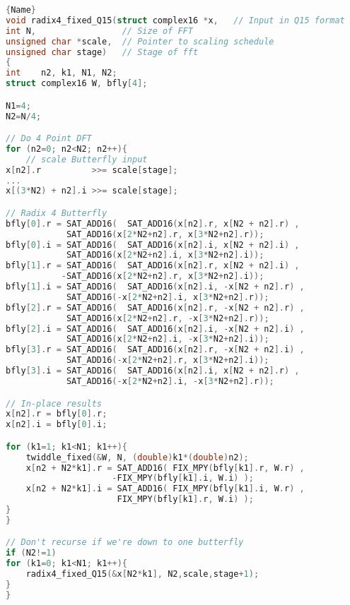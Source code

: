 \documentclass[a4paper]{article}
\begin{document}
\begin{lstlisting}[caption=fft.c - radix4 Q15,label={CODE:RADIX4},frame=tlrb, language=C]{Name}
void radix4_fixed_Q15(struct complex16 *x,   // Input in Q15 format
int N,                 // Size of FFT
unsigned char *scale,  // Pointer to scaling schedule
unsigned char stage)   // Stage of fft
{
int    n2, k1, N1, N2;
struct complex16 W, bfly[4];

N1=4;
N2=N/4;

// Do 4 Point DFT
for (n2=0; n2<N2; n2++){
    // scale Butterfly input
x[n2].r          >>= scale[stage];
...
x[(3*N2) + n2].i >>= scale[stage];

// Radix 4 Butterfly
bfly[0].r = SAT_ADD16(  SAT_ADD16(x[n2].r, x[N2 + n2].r) ,
            SAT_ADD16(x[2*N2+n2].r, x[3*N2+n2].r));
bfly[0].i = SAT_ADD16(  SAT_ADD16(x[n2].i, x[N2 + n2].i) ,
            SAT_ADD16(x[2*N2+n2].i, x[3*N2+n2].i));
bfly[1].r = SAT_ADD16(  SAT_ADD16(x[n2].r, x[N2 + n2].i) ,
           -SAT_ADD16(x[2*N2+n2].r, x[3*N2+n2].i));
bfly[1].i = SAT_ADD16(  SAT_ADD16(x[n2].i, -x[N2 + n2].r) ,
            SAT_ADD16(-x[2*N2+n2].i, x[3*N2+n2].r));
bfly[2].r = SAT_ADD16(  SAT_ADD16(x[n2].r, -x[N2 + n2].r) ,
            SAT_ADD16(x[2*N2+n2].r, -x[3*N2+n2].r));
bfly[2].i = SAT_ADD16(  SAT_ADD16(x[n2].i, -x[N2 + n2].i) ,
            SAT_ADD16(x[2*N2+n2].i, -x[3*N2+n2].i));
bfly[3].r = SAT_ADD16(  SAT_ADD16(x[n2].r, -x[N2 + n2].i) ,
            SAT_ADD16(-x[2*N2+n2].r, x[3*N2+n2].i));
bfly[3].i = SAT_ADD16(  SAT_ADD16(x[n2].i, x[N2 + n2].r) ,
            SAT_ADD16(-x[2*N2+n2].i, -x[3*N2+n2].r));

// In-place results
x[n2].r = bfly[0].r;
x[n2].i = bfly[0].i;

for (k1=1; k1<N1; k1++){
    twiddle_fixed(&W, N, (double)k1*(double)n2);
    x[n2 + N2*k1].r = SAT_ADD16( FIX_MPY(bfly[k1].r, W.r) ,
                     -FIX_MPY(bfly[k1].i, W.i) );
    x[n2 + N2*k1].i = SAT_ADD16( FIX_MPY(bfly[k1].i, W.r) ,
                      FIX_MPY(bfly[k1].r, W.i) );
}
}

// Don't recurse if we're down to one butterfly
if (N2!=1)
for (k1=0; k1<N1; k1++){
    radix4_fixed_Q15(&x[N2*k1], N2,scale,stage+1);
}
}
\end{lstlisting}
\end{document}
